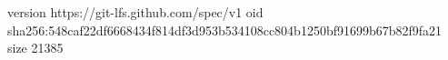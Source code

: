version https://git-lfs.github.com/spec/v1
oid sha256:548caf22df6668434f814df3d953b534108cc804b1250bf91699b67b82f9fa21
size 21385
